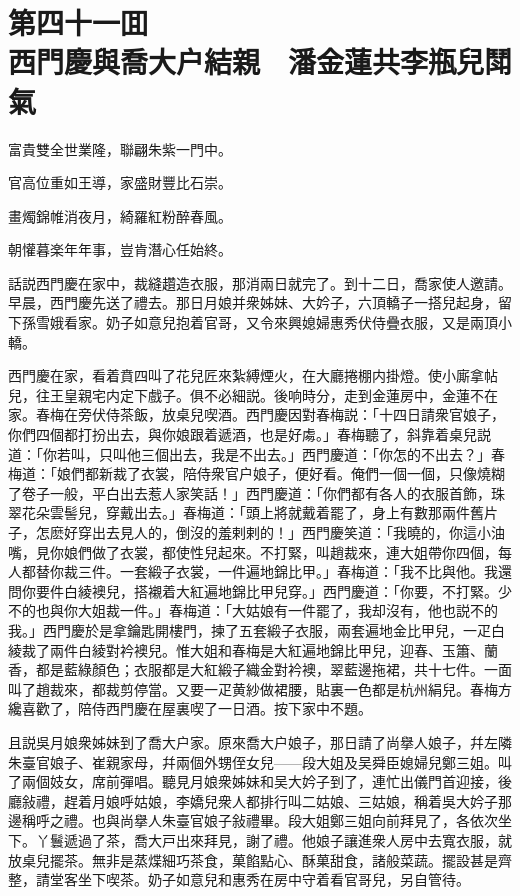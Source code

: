
\chapter*{第四十一囬　\\西門慶與喬大户結親　潘金蓮共李瓶兒鬦氣}


\begin{myquote}
富貴雙全世業隆，聯翩朱紫一門中。

官高位重如王導，家盛財豐比石崇。

畫燭錦帷消夜月，綺羅紅粉醉春風。

朝懽暮楽年年事，豈肯潛心任始終。
\end{myquote}

話説西門慶在家中，裁縫趲造衣服，那消兩日就完了。到十二日，喬家使人邀請。早晨，西門慶先送了禮去。那日月娘并衆姊妹、大妗子，六頂轎子一搭兒起身，留下孫雪娥看家。奶子如意兒抱着官哥，又令來興媳婦惠秀伏侍疊衣服，又是兩頂小轎。

西門慶在家，看着賁四叫了花兒匠來紮縛煙火，在大廳捲棚内掛燈。使小廝拿帖兒，往王皇親宅内定下戲子。俱不必細説。後响時分，走到金蓮房中，金蓮不在家。春梅在旁伏侍茶飯，放桌兒喫酒。西門慶因對春梅説：「十四日請衆官娘子，你們四個都打扮出去，與你娘跟着遞酒，也是好䖏。」春梅聽了，斜靠着桌兒説道：「你若叫，只叫他三個出去，我是不出去。」西門慶道：「你怎的不出去？」春梅道：「娘們都新裁了衣裳，陪侍衆官户娘子，便好看。俺們一個一個，只像燒糊了卷子一般，平白出去惹人家笑話！」西門慶道：「你們都有各人的衣服首飾，珠翠花朵雲髻兒，穿戴出去。」春梅道：「頭上將就戴着罷了，身上有數那兩件舊片子，怎麽好穿出去見人的，倒沒的羞剌剌的！」西門慶笑道：「我曉的，你這小油嘴，見你娘們做了衣裳，都使性兒起來。不打緊，叫趙裁來，連大姐帶你四個，每人都替你裁三件。一套緞子衣裳，一件遍地錦比甲。」春梅道：「我不比與他。我還問你要件白綾襖兒，搭襯着大紅遍地錦比甲兒穿。」西門慶道：「你要，不打緊。少不的也與你大姐裁一件。」春梅道：「大姑娘有一件罷了，我却沒有，他也説不的我。」西門慶於是拿鑰匙開樓門，揀了五套緞子衣服，兩套遍地金比甲兒，一疋白綾裁了兩件白綾對衿襖兒。惟大姐和春梅是大紅遍地錦比甲兒，迎春、玉簫、蘭香，都是藍綠顏色；衣服都是大紅緞子織金對衿襖，翠藍邊拖裙，共十七件。一面叫了趙裁來，都裁剪停當。又要一疋黄紗做裙腰，貼裏一色都是杭州絹兒。春梅方纔喜歡了，陪侍西門慶在屋裏喫了一日酒。按下家中不題。

且説吳月娘衆姊妹到了喬大户家。原來喬大户娘子，那日請了尚擧人娘子，幷左隣朱臺官娘子、崔親家母，幷兩個外甥侄女兒——段大姐及吴舜臣媳婦兒鄭三姐。叫了兩個妓女，席前彈唱。聽見月娘衆姊妹和吴大妗子到了，連忙出儀門首迎接，後廳敍禮，趕着月娘呼姑娘，李嬌兒衆人都排行叫二姑娘、三姑娘，稱着吳大妗子那邊稱呼之禮。也與尚擧人朱臺官娘子敍禮畢。段大姐鄭三姐向前拜見了，各依次坐下。丫鬟遞過了茶，喬大戸出來拜見，謝了禮。他娘子讓進衆人房中去寬衣服，就放桌兒擺茶。無非是蒸煠細巧茶食，菓餡點心、酥菓甜食，諸般菜蔬。擺設甚是齊整，請堂客坐下喫茶。奶子如意兒和惠秀在房中守着看官哥兒，另自管待。

